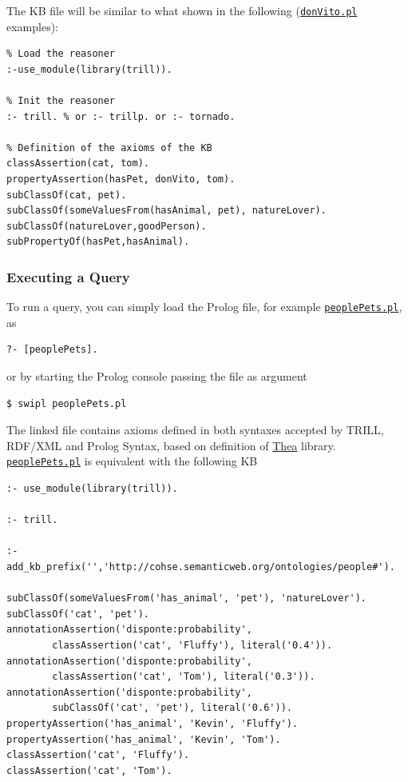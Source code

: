 \documentclass[a4paper,10pt]{scrartcl}
\begin{document}
The KB file will be similar to what shown in the following (\href{http://trill-sw.eu/example/trill/donVito.pl}{\texttt{donVito.pl}} examples):
\begin{verbatim}
% Load the reasoner
:-use_module(library(trill)).

% Init the reasoner
:- trill. % or :- trillp. or :- tornado.

% Definition of the axioms of the KB
classAssertion(cat, tom).
propertyAssertion(hasPet, donVito, tom).
subClassOf(cat, pet).
subClassOf(someValuesFrom(hasAnimal, pet), natureLover).
subClassOf(natureLover,goodPerson).
subPropertyOf(hasPet,hasAnimal).
\end{verbatim}

\subsubsection{Executing a Query}
\label{sec:trillq1}
To run a query, you can simply load the Prolog file, for example \href{http://trill-sw.eu/example/trill/peoplePets.pl}{\texttt{peoplePets.pl}}, as
\begin{verbatim}
?- [peoplePets].
\end{verbatim}
or by starting the Prolog console passing the file as argument
\begin{verbatim}
$ swipl peoplePets.pl
\end{verbatim}
\noindent
The linked file contains axioms defined in both syntaxes accepted by TRILL, RDF/XML and Prolog Syntax, based on definition of \href{http://vangelisv.github.io/thea/}{Thea} library.
\href{http://trill-sw.eu/example/trill/peoplePets.pl}{\texttt{peoplePets.pl}} is equivalent with the following KB
\begin{verbatim}
:- use_module(library(trill)).

:- trill.

:- add_kb_prefix('','http://cohse.semanticweb.org/ontologies/people#').

subClassOf(someValuesFrom('has_animal', 'pet'), 'natureLover').
subClassOf('cat', 'pet').
annotationAssertion('disponte:probability', 
        classAssertion('cat', 'Fluffy'), literal('0.4')).
annotationAssertion('disponte:probability', 
        classAssertion('cat', 'Tom'), literal('0.3')).
annotationAssertion('disponte:probability', 
        subClassOf('cat', 'pet'), literal('0.6')).
propertyAssertion('has_animal', 'Kevin', 'Fluffy').
propertyAssertion('has_animal', 'Kevin', 'Tom').
classAssertion('cat', 'Fluffy').
classAssertion('cat', 'Tom').
\end{verbatim}
\end{document}
